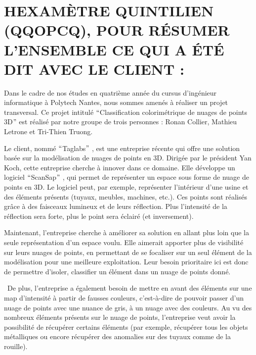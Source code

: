 \documentclass[12pt,titlepage]{report}
\begin{document}
\section{HEXAMÈTRE QUINTILIEN (QQOPCQ), POUR RÉSUMER L’ENSEMBLE CE QUI A ÉTÉ DIT AVEC LE CLIENT :}

\vspace{\baselineskip}
\begin{justify}
\tab Dans le cadre de nos études en quatrième année du cursus d’ingénieur informatique à Polytech Nantes, nous sommes amenés à réaliser un projet transversal. Ce projet intitulé $``$Classification colorimétrique de nuages de points 3D$"$  est réalisé par notre groupe de trois personnes : Ronan Collier, Mathieu Letrone et Tri-Thien Truong. 
\end{justify}\par


\vspace{\baselineskip}
\begin{justify}
Le client, nommé $``$Taglabs$"$ , est une entreprise récente qui offre une solution basée sur la modélisation de nuages de points en 3D. Dirigée par le président Yan Koch, cette entreprise cherche à innover dans ce domaine. Elle développe un logiciel $``$ScanSap$"$ , qui permet de représenter un espace sous forme de nuage de points en 3D. Le logiciel peut, par exemple, représenter l’intérieur d’une usine et des éléments présents (tuyaux, meubles, machines, etc.). Ces points sont réalisés grâce à des faisceaux lumineux et de leurs réflection. Plus l’intensité de la réflection sera forte, plus le point sera éclairé (et inversement).
\end{justify}\par


\vspace{\baselineskip}
\begin{justify}
Maintenant, l’entreprise cherche à améliorer sa solution en allant plus loin que la seule représentation d’un espace voulu. Elle aimerait apporter plus de visibilité sur leurs nuages de points, en permettant de se focaliser sur un seul élément de la modélisation pour une meilleure exploitation. Leur besoin prioritaire ici est donc de permettre d’isoler, classifier un élément dans un nuage de points donné.
\end{justify}\par

\begin{justify}
\  De plus, l’entreprise a également besoin de mettre en avant des éléments sur une map d’intensité à partir de fausses couleurs, c’est-à-dire de pouvoir passer d’un nuage de points avec une nuance de gris, à un nuage avec des couleurs. Au vu des nombreux éléments présents sur le nuage de points, l’entreprise veut avoir la possibilité de récupérer certains éléments (par exemple, récupérer tous les objets métalliques ou encore récupérer des anomalies sur des tuyaux comme de la rouille).
\end{justify}\par
\end{document}
